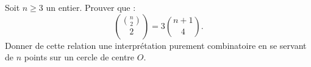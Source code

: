 Soit $n \geq 3$ un entier. Prouver que :
\[
\binom{\binom{n}{2}}{2} = 3\binom{n+1}{4}.
\]
Donner de cette relation une interprétation purement combinatoire en se servant de $n$ points sur un cercle de centre $O$.
